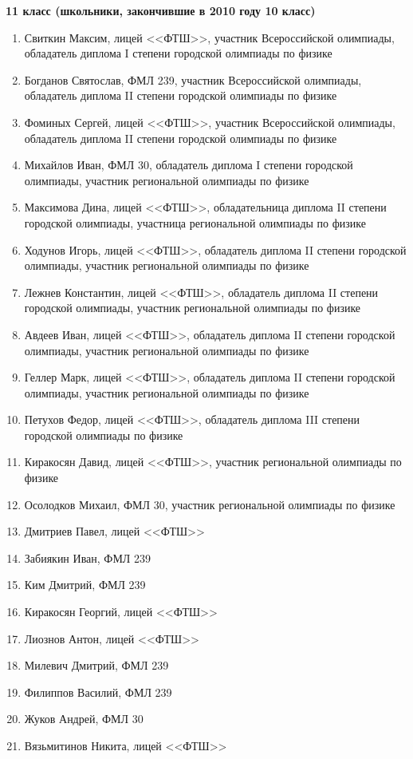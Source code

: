 \textbf{11 класс (школьники, закончившие в 2010 году 10 класс)}
\begin{enumerate}
\item Свиткин Максим, лицей <<ФТШ>>, участник Всероссийской олимпиады, обладатель диплома I степени городской олимпиады по физике
\item Богданов Святослав, ФМЛ 239, участник Всероссийской олимпиады, обладатель диплома II степени городской олимпиады по физике
\item Фоминых Сергей, лицей <<ФТШ>>, участник Всероссийской олимпиады, обладатель диплома II степени городской олимпиады по физике
\item Михайлов Иван, ФМЛ 30, обладатель диплома I степени городской олимпиады, участник региональной олимпиады по физике
\item Максимова Дина, лицей <<ФТШ>>, обладательница диплома II степени городской олимпиады, участница региональной олимпиады по физике
\item Ходунов Игорь, лицей <<ФТШ>>, обладатель диплома II степени городской олимпиады, участник региональной олимпиады по физике
\item Лежнев Константин, лицей <<ФТШ>>, обладатель диплома II степени городской олимпиады, участник региональной олимпиады по физике
\item Авдеев Иван, лицей <<ФТШ>>, обладатель диплома II степени городской олимпиады, участник региональной олимпиады по физике
\item Геллер Марк, лицей <<ФТШ>>, обладатель диплома II степени городской олимпиады, участник региональной олимпиады по физике
\item Петухов Федор, лицей <<ФТШ>>, обладатель диплома III степени городской олимпиады по физике
\item Киракосян Давид, лицей <<ФТШ>>, участник региональной олимпиады по физике
\item Осолодков Михаил, ФМЛ 30, участник региональной олимпиады по физике
\item Дмитриев Павел, лицей <<ФТШ>>
\item Забиякин Иван, ФМЛ 239	
\item Ким Дмитрий, ФМЛ 239
\item Киракосян Георгий, лицей <<ФТШ>>
\item Лиознов Антон, лицей <<ФТШ>>
\item Милевич Дмитрий, ФМЛ 239
\item Филиппов Василий, ФМЛ 239
\item Жуков Андрей, ФМЛ 30
\item Вязьмитинов Никита, лицей <<ФТШ>>
\end{enumerate}
